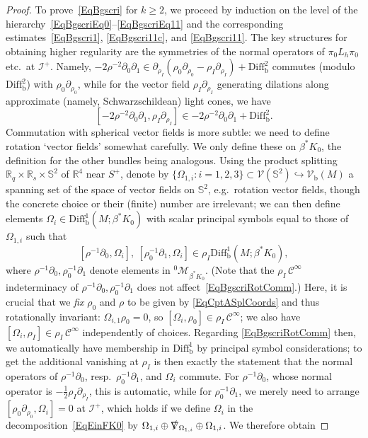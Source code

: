 \documentclass[reqno,11pt,letterpaper]{amsart}
\numberwithin{equation}{section}
\numberwithin{figure}{section}
\theoremstyle{definition}
\theoremstyle{remark}
\newcommand{\mc}{\mathcal}
\newcommand{\cC}{\mc C}
\newcommand{\cM}{\mc M}
\newcommand{\cV}{\mc V}
\newcommand{\ms}{\mathscr}
\newcommand{\scri}{\ms I}
\newcommand{\R}{\mathbb{R}}
\newcommand{\Sph}{\mathbb{S}}
\newcommand{\slnabla}{\slashed{\nabla}{}}
\newcommand{\hra}{\hookrightarrow}
\newcommand{\pa}{\partial}
\newcommand{\bop}{{\mathrm{b}}}
\newcommand{\Diff}{\mathrm{Diff}}
\newcommand{\Vf}{\mathcal V}
\newcommand{\Vb}{\Vf_\bop}
\newcommand{\Diffb}{\Diff_\bop}
\newcommand{\half}{\tfrac{1}{2}}
\newcommand{\CI}{\cC^\infty}
\begin{document}
\begin{proof}
  To prove~\eqref{EqBgscri} for $k\geq 2$, we proceed by induction on the level of the hierarchy~\eqref{EqBgscriEq0}--\eqref{EqBgscriEq11} and the corresponding estimates~\eqref{EqBgscri1}, \eqref{EqBgscri11c}, and \eqref{EqBgscri11}. The key structures for obtaining higher regularity are the symmetries of the normal operators of $\pi_0 L_h\pi_0$ etc.\ at $\scri^+$. Namely, $-2\rho^{-2}\pa_0\pa_1\in\pa_{\rho_I}(\rho_0\pa_{\rho_0}-\rho_I\pa_{\rho_I})+\Diffb^2$ commutes (modulo $\Diffb^2$) with $\rho_0\pa_{\rho_0}$, while for the vector field $\rho_I\pa_{\rho_I}$ generating dilations along approximate (namely, Schwarzschildean) light cones, we have
  \[
    [-2\rho^{-2}\pa_0\pa_1,\rho_I\pa_{\rho_I}] \in -2\rho^{-2}\pa_0\pa_1 + \Diffb^2.
  \]
  Commutation with spherical vector fields is more subtle: we need to define rotation `vector fields' somewhat carefully. We only define these on $\beta^*K_0$, the definition for the other bundles being analogous. Using the product splitting $\R_q\times\R_s\times\Sph^2$ of $\R^4$ near $S^+$, denote by $\{\Omega_{1,i}\colon i=1,2,3\}\subset\cV(\Sph^2)\hra\Vb(M)$ a spanning set of the space of vector fields on $\Sph^2$, e.g.\ rotation vector fields, though the concrete choice or their (finite) number are irrelevant; we can then define elements $\Omega_i\in\Diffb^1(M;\beta^*K_0)$ with scalar principal symbols equal to those of $\Omega_{1,i}$ such that
  \begin{equation}
  \label{EqBgscriRotComm}
    [\rho^{-1}\pa_0,\Omega_i],\ [\rho_0^{-1}\pa_1,\Omega_i] \in \rho_I\Diffb^1(M;\beta^*K_0),
  \end{equation}
  where $\rho^{-1}\pa_0,\rho_0^{-1}\pa_1$ denote elements in ${}^0\cM_{\beta^*K_0}$. (Note that the $\rho_I\,\CI$ indeterminacy of $\rho^{-1}\pa_0,\rho_0^{-1}\pa_1$ does not affect~\eqref{EqBgscriRotComm}.) Here, it is crucial that we \emph{fix} $\rho_0$ and $\rho$ to be given by \eqref{EqCptASplCoords} and thus rotationally invariant: $\Omega_{i,1}\rho_0=0$, so $[\Omega_i,\rho_0]\in\rho_I\,\CI$; we also have $[\Omega_i,\rho_I]\in\rho_I\,\CI$ independently of choices. Regarding \eqref{EqBgscriRotComm} then, we automatically have membership in $\Diffb^1$ by principal symbol considerations; to get the additional vanishing at $\rho_I$ is then exactly the statement that the normal operators of $\rho^{-1}\pa_0$, resp.\ $\rho_0^{-1}\pa_1$, and $\Omega_i$ commute. For $\rho^{-1}\pa_0$, whose normal operator is $-\half\rho_I\pa_{\rho_I}$, this is automatic, while for $\rho_0^{-1}\pa_1$, we merely need to arrange $[\rho_0\pa_{\rho_0},\Omega_i]=0$ at $\scri^+$, which holds if we define $\Omega_i$ in the decomposition~\eqref{EqEinFK0} by $\Omega_{1,i}\oplus\slnabla_{\Omega_{1,i}}\oplus\Omega_{1,i}$. We therefore obtain

\end{proof}
\end{document}
